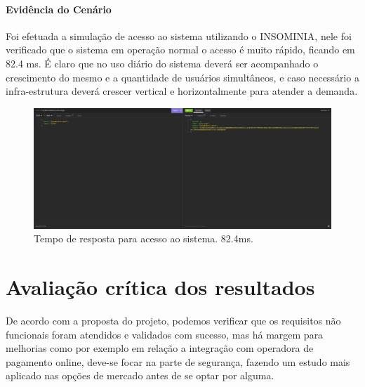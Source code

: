  \subsubsection{Evidência do Cenário \avcen} 

 Foi efetuada a simulação de acesso ao sistema utilizando o INSOMINIA, nele foi verificado que o sistema em operação normal 
 o acesso é muito rápido, ficando em 82.4 ms. É claro que no uso diário do sistema deverá ser acompanhado o crescimento do mesmo e a 
 quantidade de usuários simultâneos, e caso necessário a infra-estrutura deverá crescer vertical e horizontalmente para atender a demanda.

 \begin{figure}[ht]
    \centering
    \includegraphics[width=1\textwidth]{desempenho.png}
    \caption{Tempo de resposta para acesso ao sistema. 82.4ms.}
    \label{fig:Tempo de resposta para acesso ao sistema. 82.4ms.}
 \end{figure}

 \chapter{Avaliação crítica dos resultados}

 De acordo com a proposta do projeto, podemos verificar que os requisitos não funcionais foram atendidos e validados com sucesso, mas há margem para melhorias como por exemplo em relação a integração com 
 operadora de pagamento online, deve-se focar na parte de segurança, fazendo um estudo mais aplicado nas opções de mercado antes de se optar por alguma.

